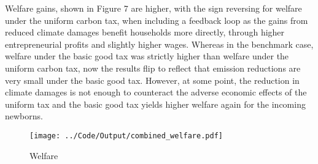 \documentclass[12pt,a4paper]{article}
\begin{document}
\hspace*{6mm} Welfare gains, shown in Figure 7 are higher, with the sign reversing for welfare under the uniform carbon tax, when including a feedback loop as the gains from reduced climate damages benefit households more directly, through higher entrepreneurial profits and slightly higher wages. Whereas in the benchmark case, welfare under the basic good tax was strictly higher than welfare under the uniform carbon tax, now the results flip to reflect that emission reductions are very small under the basic good tax. However, at some point, the reduction in climate damages is not enough to counteract the adverse economic effects of the uniform tax and the basic good tax yields higher welfare again for the incoming newborns. 

\begin{figure}[h]
    \centering
    \caption{Welfare}
\texttt{[image: ../Code/Output/combined\_welfare.pdf]}   
\end{figure}
\end{document}
